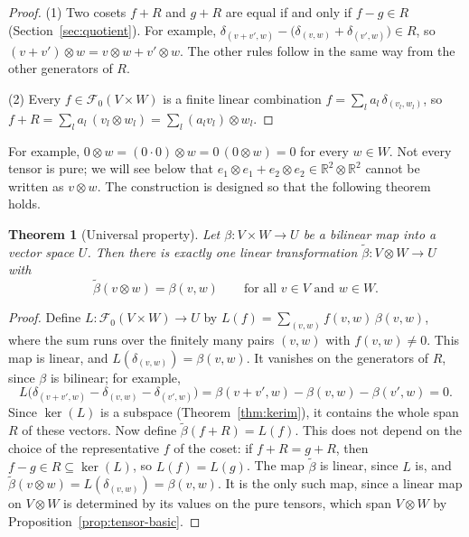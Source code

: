 \documentclass[11pt]{article}
\theoremstyle{definition}
\theoremstyle{plain}
\newtheorem{theorem}[definition]{Theorem}
\theoremstyle{remark}
\begin{document}
\begin{proof}
    (1) Two cosets $f + R$ and $g + R$ are equal if and only if $f - g \in R$ (Section~\ref{sec:quotient}). For example, $\delta_{(v + v', w)} - \big(\delta_{(v, w)} + \delta_{(v', w)}\big) \in R$, so $(v + v') \otimes w = v \otimes w + v' \otimes w$. The other rules follow in the same way from the other generators of $R$.

    (2) Every $f \in \mathcal{F}_0(V \times W)$ is a finite linear combination $f = \sum_l a_l\,\delta_{(v_l, w_l)}$, so $f + R = \sum_l a_l\,(v_l \otimes w_l) = \sum_l (a_lv_l) \otimes w_l$.
\end{proof}

For example, $0 \otimes w = (0 \cdot 0) \otimes w = 0\,(0 \otimes w) = 0$ for every $w \in W$. Not every tensor is pure; we will see below that $e_1 \otimes e_1 + e_2 \otimes e_2 \in \mathbb{R}^2 \otimes \mathbb{R}^2$ cannot be written as $v \otimes w$. The construction is designed so that the following theorem holds.

\begin{theorem}[Universal property]\label{thm:universal}
    Let $\beta: V \times W \to U$ be a bilinear map into a vector space $U$. Then there is exactly one linear transformation $\tilde\beta: V \otimes W \to U$ with
    \[\tilde\beta(v \otimes w) = \beta(v, w) \qquad \text{for all } v \in V \text{ and } w \in W.\]
\end{theorem}

\begin{proof}
    Define $L: \mathcal{F}_0(V \times W) \to U$ by $L(f) = \sum_{(v, w)} f(v, w)\,\beta(v, w)$, where the sum runs over the finitely many pairs $(v, w)$ with $f(v, w) \neq 0$. This map is linear, and $L(\delta_{(v, w)}) = \beta(v, w)$. It vanishes on the generators of $R$, since $\beta$ is bilinear; for example,
    \[L\big(\delta_{(v + v', w)} - \delta_{(v, w)} - \delta_{(v', w)}\big) = \beta(v + v', w) - \beta(v, w) - \beta(v', w) = 0.\]
    Since $\ker(L)$ is a subspace (Theorem~\ref{thm:kerim}), it contains the whole span $R$ of these vectors. Now define $\tilde\beta(f + R) = L(f)$. This does not depend on the choice of the representative $f$ of the coset: if $f + R = g + R$, then $f - g \in R \subseteq \ker(L)$, so $L(f) = L(g)$. The map $\tilde\beta$ is linear, since $L$ is, and $\tilde\beta(v \otimes w) = L(\delta_{(v, w)}) = \beta(v, w)$. It is the only such map, since a linear map on $V \otimes W$ is determined by its values on the pure tensors, which span $V \otimes W$ by Proposition~\ref{prop:tensor-basic}.
\end{proof}
\end{document}
